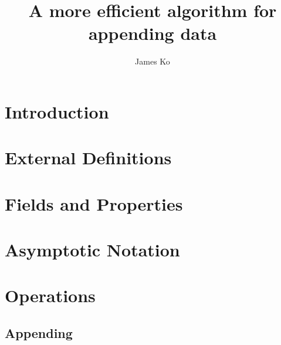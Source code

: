 \documentclass{article}
\title{A more efficient algorithm for appending data}
\author{James Ko}
\begin{document}
	\begin{titlepage}
		\maketitle
	\end{titlepage}
	
	\begin{abstract}
		
	\end{abstract}

	\newpage

	\section{Introduction}

	
	
	\section{External Definitions}
	
	
	
	\section{Fields and Properties}
	
	
	
	\section{Asymptotic Notation}
	
	
	
	\section{Operations}
	
	
	
	\subsection{Appending}
	\label{subsec:Appending}
	
	
	
	
	
	
	
	
	
\end{document}
